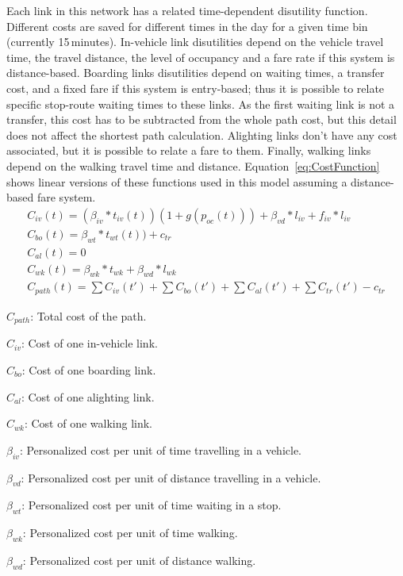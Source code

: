 Each link in this network has a related time-dependent disutility function. Different costs are saved for different times in the day for a given time bin (currently 15\,minutes). In-vehicle link disutilities depend on the vehicle travel time, the travel distance, the level of occupancy and a fare rate if this system is distance-based. Boarding links disutilities depend on waiting times, a transfer cost, and a fixed fare if this system is entry-based; thus it is possible to relate specific stop-route waiting times to these links. As the first waiting link is not a transfer, this cost has to be subtracted from the whole path cost, but this detail does not affect the shortest path calculation. Alighting links don't have any cost associated, but it is possible to relate a fare to them. Finally, walking links depend on the walking travel time and distance. Equation~\ref{eq:CostFunction} shows linear versions of these functions used in this model assuming a distance-based fare system.
\begin{equation}\label{eq:CostFunction}
	\begin{array}{l}
		C_{iv}(t) = (\beta_{iv}*t_{iv}(t))(1+g(p_{oc}(t))) + \beta_{vd}*l_{iv} + f_{iv}*l_{iv}\\
		C_{bo}(t) = \beta_{wt}*t_{wt}(t)) + c_{tr}\\
		C_{al}(t) = 0\\
		C_{wk}(t) = \beta_{wk}*t_{wk} + \beta_{wd}*l_{wk}\\
		C_{path}(t) = \sum{C_{iv}(t')} + \sum{C_{bo}(t')} + \sum{C_{al}(t')} + \sum{C_{tr}(t')} - c_{tr}
	\end{array}
\end{equation}

$C_{path}$: Total cost of the path.

$C_{iv}$: Cost of one in-vehicle link.

$C_{bo}$: Cost of one boarding link.

$C_{al}$: Cost of one alighting link.

$C_{wk}$: Cost of one walking link.

$\beta_{iv}$: Personalized cost per unit of time travelling in a vehicle.

$\beta_{vd}$: Personalized cost per unit of distance travelling in a vehicle.

$\beta_{wt}$: Personalized cost per unit of time waiting in a stop.

$\beta_{wk}$: Personalized cost per unit of time walking.

$\beta_{wd}$: Personalized cost per unit of distance walking.

